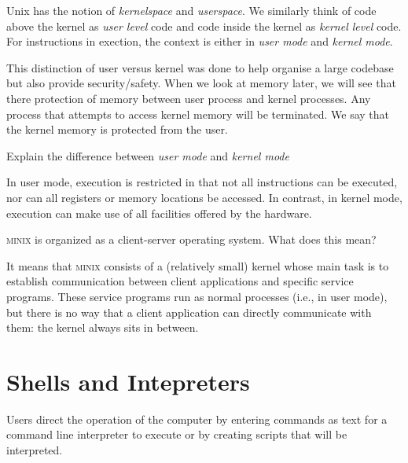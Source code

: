 Unix has the notion of \textit{kernelspace} and \textit{userspace}. 
We similarly think of code above the kernel as \textit{user level} code and 
code inside the kernel as \textit{kernel level} code.
For instructions in exection, the context is either in 
\textit{user mode} and \textit{kernel mode}.

This distinction of user versus kernel
 was done to help organise a large codebase but also provide security/safety.
When we look at memory later, we will see that there protection of 
memory between user process and kernel processes. Any process that attempts to access 
kernel memory will be terminated. We say that the kernel memory is protected from the user. 

\begin{example}
Explain the difference between \textit{user mode} and \textit{kernel mode}

In user mode, execution is restricted in that not all instructions can be executed, nor can all registers or memory locations be accessed. In contrast, in kernel mode, execution can make use of all facilities offered by the hardware.
\end{example}


\begin{example}
\textsc{minix} is organized as a client-server operating system. What does this mean?

It means that \textsc{minix} consists of a (relatively small) kernel whose main task is to establish communication between client applications and speciﬁc service programs. These service programs run
as normal processes (i.e., in user mode), but there is no way that a client application can directly
communicate with them: the kernel always sits in between.
\end{example}


\section{Shells and Intepreters}



Users direct the operation of the computer by entering commands as text for a command line interpreter to 
execute or by creating scripts that will be interpreted.

